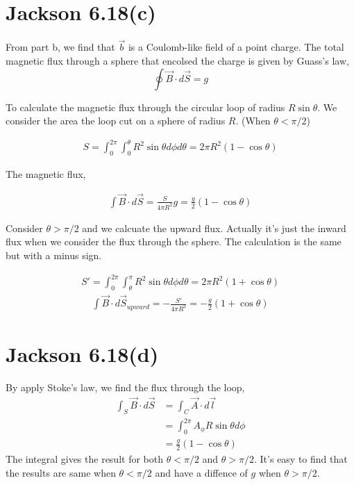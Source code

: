 \documentclass{article}
\begin{document}
\section*{Jackson 6.18(c)}

From part b, we find that $\vec b$ is a Coulomb-like field of a point charge. The total magnetic flux through a sphere that encolsed the charge is given by Guass's law,
\[ \oint\vec B\cdot d\vec S=g \]

To calculate the magnetic flux through the circular loop of radius $R\sin\theta$. We consider the area the loop cut on a sphere of radius $R$. (When $\theta<\pi/2$)

\begin{align*}
  S=\int_0^{2\pi}\int_0^{\theta}R^2\sin\theta d\phi d\theta=2\pi R^2(1-\cos\theta)
\end{align*}

The magnetic flux,

\begin{align*}
  \int\vec B\cdot d\vec S=\frac{S}{4\pi R^2}g=\frac{g}{2}(1-\cos\theta)
\end{align*}

Consider $\theta>\pi/2$ and we calcuate the upward flux. Actually it's just the inward flux when we consider the flux through the sphere. The calculation is the same but with a minus sign.

\begin{align*}
  S'=\int_0^{2\pi}\int_{\theta}^{\pi}R^2\sin\theta d\phi d\theta=2\pi R^2(1+\cos\theta)
\end{align*}
\begin{align*}
  \int\vec B\cdot d\vec S_{upward}=-\frac{S'}{4\pi R^2}=-\frac{g}{2}(1+\cos\theta)
\end{align*}

\section*{Jackson 6.18(d)}

By apply Stoke's law, we find the flux through the loop,
\begin{align*}
  \int_S\vec B\cdot d\vec S&=\int_C\vec A\cdot d\vec l\\
                           &=\int_0^{2\pi}A_\phi R\sin\theta d\phi\\
                           &=\frac{g}{2}(1-\cos\theta)
\end{align*}
The integral gives the result for both $\theta<\pi/2$ and $\theta>\pi/2$. It's easy to find that the results are same when $\theta<\pi/2$ and have a diffence of $g$ when $\theta>\pi/2$.
\pagebreak
\end{document}

